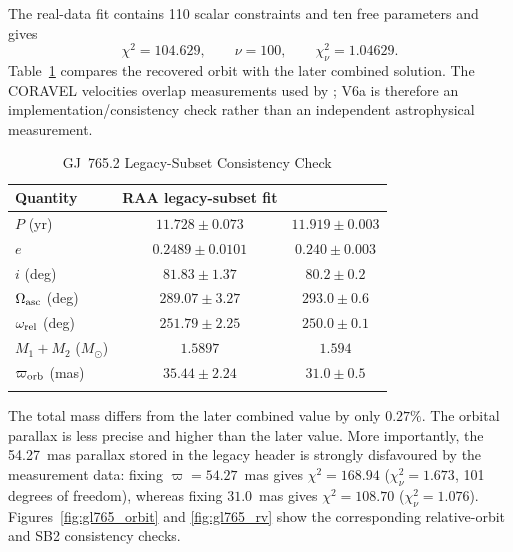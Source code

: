 The real-data fit contains 110 scalar constraints and ten free parameters and gives
\begin{equation}
\chi^2=104.629,\qquad \nu=100,\qquad \chi^2_\nu=1.04629.
\end{equation}
Table~\ref{tab:gl765} compares the recovered orbit with the later combined solution. The CORAVEL velocities overlap measurements used by \citet{Balega2007}; V6a is therefore an implementation/consistency check rather than an independent astrophysical measurement.

\begin{table}
\begin{center}
\caption{GJ~765.2 Legacy-Subset Consistency Check}
\label{tab:gl765}
\begin{tabular}{lcc}
\hline\noalign{\smallskip}
Quantity & RAA legacy-subset fit & \citet{Balega2007}\\
\hline\noalign{\smallskip}
$P$ (yr) & $11.728\pm0.073$ & $11.919\pm0.003$\\
$e$ & $0.2489\pm0.0101$ & $0.240\pm0.003$\\
$i$ (deg) & $81.83\pm1.37$ & $80.2\pm0.2$\\
$\Omega_{\rm asc}$ (deg) & $289.07\pm3.27$ & $293.0\pm0.6$\\
$\omega_{\rm rel}$ (deg) & $251.79\pm2.25$ & $250.0\pm0.1$\\
$M_1+M_2$ ($M_\odot$) & $1.5897$ & $1.594$\\
$\varpi_{\rm orb}$ (mas) & $35.44\pm2.24$ & $31.0\pm0.5$\\
\noalign{\smallskip}\hline
\end{tabular}
\end{center}
\end{table}

The total mass differs from the later combined value by only $0.27\%$. The orbital parallax is less precise and higher than the later value. More importantly, the 54.27~mas parallax stored in the legacy header is strongly disfavoured by the measurement data: fixing $\varpi=54.27$~mas gives $\chi^2=168.94$ ($\chi^2_\nu=1.673$, 101 degrees of freedom), whereas fixing $31.0$~mas gives $\chi^2=108.70$ ($\chi^2_\nu=1.076$). Figures~\ref{fig:gl765_orbit} and \ref{fig:gl765_rv} show the corresponding relative-orbit and SB2 consistency checks.


